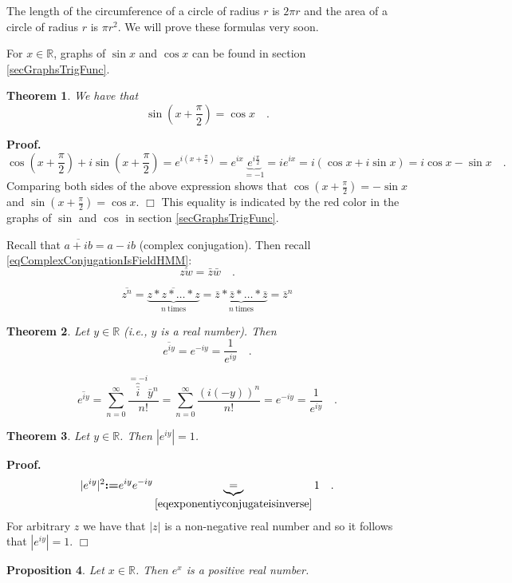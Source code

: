 \documentclass[12pt]{book}
\newcommand{\eqdef}{\textbf{:=}}
\newenvironment{proof}[1][]{ \textbf{Proof#1.} }{$\Box$\medskip}
\newtheorem{theorem}{Theorem}[section]
\newtheorem{proposition}[theorem]{Proposition}
\begin{document}
The length of the circumference of a circle of radius $r$ is $2\pi r$ and the area of a circle of radius $r$ is $\pi r^2$. We will prove these formulas very soon. 

For $x\in \mathbb R$, graphs of $\sin x$ and $\cos x$ can be found in section \ref{secGraphsTrigFunc}.
\begin{theorem} We have that
\[
\sin \left(x+\frac{\pi}{2}\right)= \cos x \quad .
\]
\end{theorem}

\begin{proof}
\[
\cos\left(x+\frac{\pi}{2}\right)+ i\sin \left(x+\frac{\pi}2\right)=e^{i(x+\frac{\pi}{2})}= e^{ix} \underbrace{e^{ i\frac{\pi}2 }}_{=-1}= ie^{ix}= i(\cos x + i \sin x)= i\cos x- \sin x\quad .
\]
Comparing both sides of the above expression shows that $\cos(x+\frac{\pi}{2})=-\sin x$ and $\sin(x+\frac{\pi}{2})= \cos x$.
\end{proof}
This equality is indicated by the red color in the graphs of $\sin$ and $\cos$ in section \ref{secGraphsTrigFunc}. 

Recall that $\overline{a+ib}=a-ib$  (complex conjugation). Then recall \eqref{eqComplexConjugationIsFieldHMM}:
\[
\overline {z w}= \bar z \bar w\quad .
\]

\[
\overline {z^n}= \overline {\underbrace{z*z*\dots*z}_{n\mathrm{~times}}} = \underbrace{\bar z* \bar z *\dots * \bar z}_{n\mathrm{~times}}= \bar {z}^n
\]

\begin{theorem}
Let $y\in \mathbb R$ (i.e., $y$ is a real number). Then 
\begin{equation}\label{eqexponentiyconjugateisinverse}
\overline {e^{iy}}=e^{-iy}= \frac{1}{e^{iy}}\quad .
\end{equation}
\end{theorem}
\[
\overline {e^{iy}}= \sum_{n=0}^\infty \frac{\overbrace{\bar i}^{=-i} \bar y^n}{n!}= \sum_{n=0}^\infty \frac{(i(-y))^n}{n!}=  e^{-iy}= \frac{1}{e^{iy}}\quad .
\]
\begin{theorem}
Let $y\in \mathbb R$. Then $|e^{iy}|=1$. 
\end{theorem}
\begin{proof}
\[
|e^{iy}|^2 \eqdef e^{iy}e^{-iy}\underbrace{=}_{\eqref{eqexponentiyconjugateisinverse}}1 \quad .
\]
For arbitrary $z$ we have that $|z|$ is a non-negative real number and so it follows that $|e^{iy}|=1$. 
\end{proof}

\begin{proposition}
Let $x\in \mathbb R$. Then $e^x$ is a positive real number.
\end{proposition}
\end{document}
